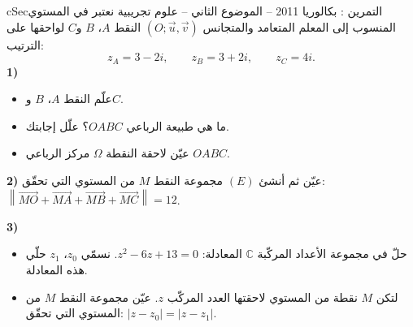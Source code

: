 \documentclass[12pt,a4paper]{article}
\newenvironment{BOX}[2]{\begin{otherlanguage}{english}\begin{arbox}{#1}{#2}}{\end{arbox}\end{otherlanguage}}
\newcounter{exo}
\newenvironment{tamrin}[1]{\stepcounter{exo}\begin{BOX}{cSec}{التمرين \theexo: #1}}{\end{BOX}}
\newenvironment{sq}{\begin{itemize}[leftmargin=2.4em,itemsep=3pt]}{\end{itemize}}
\newcommand{\qa}{\item[(أ)]}\newcommand{\qb}{\item[(ب)]}\newcommand{\qc}{\item[(جـ)]}\newcommand{\qd}{\item[(د)]}\newcommand{\qe}{\item[(هـ)]}
\begin{document}
\begin{tamrin}{بكالوريا 2011 -- الموضوع الثاني -- علوم تجريبية}
نعتبر في المستوي المنسوب إلى المعلم المتعامد والمتجانس $(O;\vec u,\vec v)$ النقط $A$، $B$ و$C$ لواحقها على الترتيب:
\[z_A=3-2i,\qquad z_B=3+2i,\qquad z_C=4i .\]
\textbf{1)}
\begin{sq}
\qa علّم النقط $A$، $B$ و$C$.
\qb ما هي طبيعة الرباعي $OABC$؟ علّل إجابتك.
\qc عيّن لاحقة النقطة $\Omega$ مركز الرباعي $OABC$.
\end{sq}
\textbf{2)} عيّن ثم أنشئ $(E)$ مجموعة النقط $M$ من المستوي التي تحقّق: $\left\|\overrightarrow{MO}+\overrightarrow{MA}+\overrightarrow{MB}+\overrightarrow{MC}\right\|=12$.

\textbf{3)}
\begin{sq}
\qa حلّ في مجموعة الأعداد المركّبة $\mathbb{C}$ المعادلة: $z^2-6z+13=0$. نسمّي $z_0$، $z_1$ حلّي هذه المعادلة.
\qb لتكن $M$ نقطة من المستوي لاحقتها العدد المركّب $z$. عيّن مجموعة النقط $M$ من المستوي التي تحقّق: $|z-z_0|=|z-z_1|$.
\end{sq}
\end{tamrin}
\end{document}
